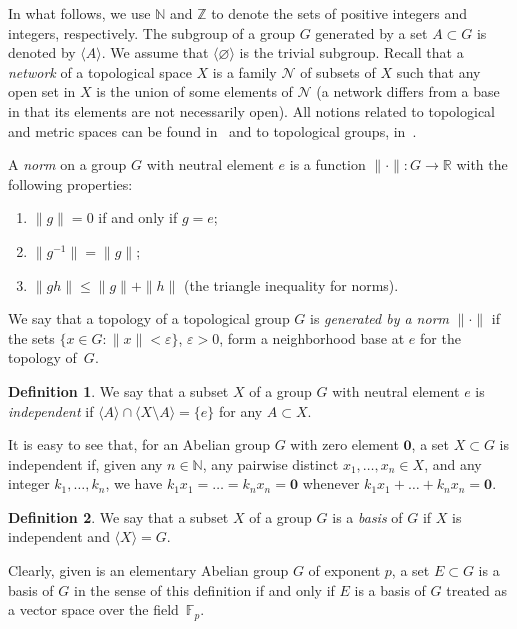 \documentclass[12pt,a4paper]{amsart}
\theoremstyle{definition}
\newtheorem*{definition*}{Definition}
\newcommand{\zero}{{\mathbf 0}}
\begin{document}
In what follows, we use $\mathbb N$ and $\mathbb Z$ to denote the sets of positive integers and integers, 
respectively. The subgroup of a group $G$ generated by a set $A\subset G$ is denoted by $\langle A\rangle$. 
We assume that $\langle \varnothing\rangle$ is the trivial subgroup. Recall that a \emph{network} of a 
topological space $X$ is a family $\mathscr N$ of subsets of $X$ such that any open set in $X$ is the union 
of some elements of $\mathscr N$ (a network differs from a base in that its elements are not necessarily open). 
All notions related to topological and metric 
spaces can be found in~\cite{Engelking} and to topological groups, in~\cite{AT}. 

A \emph{norm} on a group $G$ with neutral element $e$ is a function $\lVert\boldsymbol\cdot\rVert\colon G\to 
\mathbb R$ with the following properties: 
\begin{enumerate} 
\item $\|g\|=0$ if and only if $g=e$; 
\item $\|g^{-1}\| = \|g\|$; 
\item $\|gh\|\le \|g\|+\|h\|$ (the triangle inequality for norms). 
\end{enumerate} 
We say that a topology of a topological group $G$ is \emph{generated by a norm} $\lVert \boldsymbol\cdot \rVert$ 
if the sets $\{x\in G: \|x\|< \varepsilon\}$, $\varepsilon > 0$, form a neighborhood base at $e$ for the topology 
of~$G$. 

\begin{definition*}
We say that a subset $X$ of a group $G$ with neutral element $e$ is \emph{independent} if $\langle A\rangle \cap 
\langle X\setminus A\rangle=\{e\}$ for any $A\subset X$. 
\end{definition*}

It is easy to see that, for an Abelian group $G$ with zero element $\zero$, a set $X\subset G$ is independent if, 
given any 
$n\in \mathbb N$, any pairwise distinct $x_1,\dots, x_n\in X$, and any integer $k_1,\dots, k_n$, we have 
$k_1 x_1=\dots= k_n x_n=\zero$ whenever $k_1 x_1+ \dots + k_n x_n=\zero$.   

\begin{definition*}
We say that a subset $X$ of a group $G$ is a \emph{basis} of $G$ if $X$ is independent and $\langle X\rangle =G$.
\end{definition*}

Clearly, given  is an elementary Abelian group $G$ of exponent $p$, a set $E\subset G$ is a basis of $G$ in the 
sense of this definition if and only if $E$ is a basis of $G$ treated as a vector space over the 
field~$\mathbb F_p$. 
\end{document}
